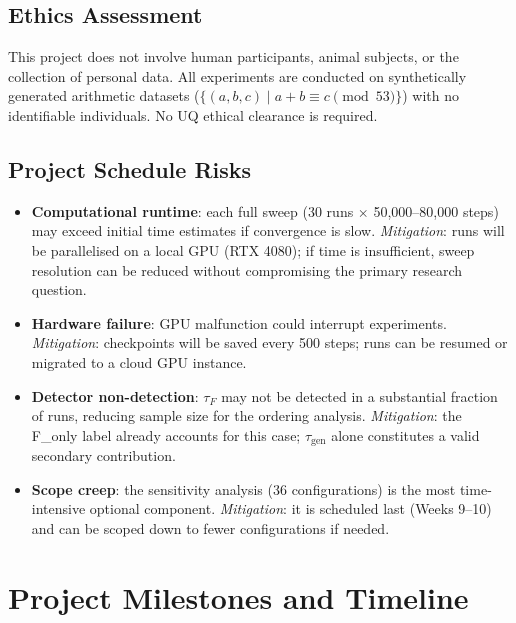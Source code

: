 \documentclass[12pt,openany,a4paper]{book}
\newcommand{\taug}{\tau_{\mathrm{gen}}}
\newcommand{\tauf}{\tau_{F}}
\begin{document}
\subsection{Ethics Assessment}

This project does not involve human participants, animal subjects, or the collection of personal data.
All experiments are conducted on synthetically generated arithmetic
datasets ($\{(a,b,c) \mid a+b \equiv c \pmod{53}\}$) with no
identifiable individuals.
No UQ ethical clearance is required.

\subsection{Project Schedule Risks}

\begin{itemize}
  \item \textbf{Computational runtime}: each full sweep (30 runs
    $\times$ 50{,}000--80{,}000 steps) may exceed initial time
    estimates if convergence is slow.
    \textit{Mitigation}: runs will be parallelised on a local GPU (RTX 4080);
    if time is insufficient, sweep resolution can be reduced without
    compromising the primary research question.
  \item \textbf{Hardware failure}: GPU malfunction could interrupt
    experiments.
    \textit{Mitigation}: checkpoints will be saved every 500 steps; runs
    can be resumed or migrated to a cloud GPU instance.
  \item \textbf{Detector non-detection}: $\tauf$ may not be detected
    in a substantial fraction of runs, reducing sample size for the
    ordering analysis.
    \textit{Mitigation}: the F\_only label already accounts for this
    case; $\taug$ alone constitutes a valid secondary contribution.
  \item \textbf{Scope creep}: the sensitivity analysis (36 configurations)
    is the most time-intensive optional component.
    \textit{Mitigation}: it is scheduled last (Weeks 9--10) and can
    be scoped down to fewer configurations if needed.
\end{itemize}

\section{Project Milestones and Timeline}
\end{document}
